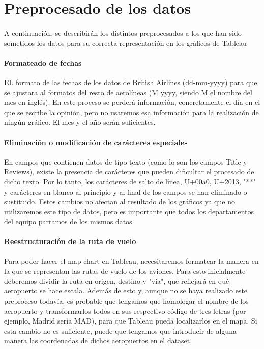 \documentclass{report}
\begin{document}
        \section{Preprocesado de los datos}
            \paragraph*{}{A continuación, se describirán los distintos preprocesados a los que han sido sometidos los datos para su correcta representación en los gráficos de Tableau}
            \paragraph*{Formateado de fechas}{EL formato de las fechas de los datos de British Airlines (dd-mm-yyyy) para que se ajustara al formatos del resto de aerolíneas (M yyyy, siendo M el nombre del mes en inglés). En este proceso se perderá información, concretamente el día en el que se escribe la opinión, pero no usaremos esa información para la realización de ningún gráfico. El mes y el año serán suficientes.}
            \paragraph*{Eliminación o modificación de carácteres especiales}{En campos que contienen datos de tipo texto (como lo son los campos Title y Reviews), existe la presencia de carácteres que pueden dificultar el procesado de dicho texto. Por lo tanto, los carácteres de salto de línea, U+00a0, U+2013, "**" y carácteres en blanco al principio y al final de los campos se han eliminado o sustituido. Estos cambios no afectan al resultado de los gráficos ya que no utilizaremos este tipo de datos, pero es importante que todos los departamentos del equipo partamos de los mismos datos.}
            \paragraph*{Reestructuración de la ruta de vuelo}{Para poder hacer el map chart en Tableau, necesitaremos formatear la manera en la que se representan las rutas de vuelo de los aviones. Para esto inicialmente deberemos dividir la ruta en origen, destino y "vía", que reflejará en qué aeropuerto se hace escala. Además de esto y, aunque no se haya realizado este preproceso todavía, es probable que tengamos que homologar el nombre de los aeropuerto y transformarlos todos en sus respectivo código de tres letras (por ejemplo, Madrid sería MAD), para que Tableau pueda localizarlos en el mapa. Si esta cambio no es suficiente, puede que tengamos que introducir de alguna manera las coordenadas de dichos aeropuertos en el dataset.}
\end{document}
